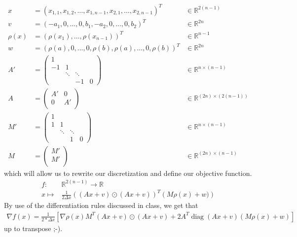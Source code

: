 \documentclass{article}
\DeclareMathOperator{\diag}{diag}
\begin{document}
\begin{align*}
  x&=(x_{1,1},x_{1,2},\dotsc,x_{1,n-1},x_{2,1},\dotsc,x_{2,n-1})^{T} &\in \mathbb{R}^{2(n-1)} \\
  v&=(-a_{1},0,\dotsc,0,b_{1},-a_{2},0,\dotsc,0,b_{2})^{T} &\in \mathbb{R}^{2n} \\
 \rho(x)&=(\rho(x_1),\dotsc,\rho(x_{n-1}))^{T}  &\in \mathbb{R}^{n-1} \\
 w&=(\rho(a),0,\dotsc,0,\rho(b),\rho(a),\dotsc,0,\rho(b))^{T}  &\in \mathbb{R}^{2n}  \\
A'&=\begin{pmatrix}
 1& & & \\
-1&1& & \\
  &\ddots &\ddots & \\
  & &-1 &0  
\end{pmatrix}& \in \mathbb{R}^{n\times(n-1)} \\
A&=\begin{pmatrix}
A' & 0 \\
0 & A' \\
\end{pmatrix} & \in \mathbb{R}^{(2n)\times(2(n-1))} \\
M'&=\begin{pmatrix}
 1& & & \\
1&1& & \\
  &\ddots &\ddots & \\
  & &1 &0  
\end{pmatrix}& \in \mathbb{R}^{n\times(n-1)} \\
M&=
\begin{pmatrix}
M' \\
M' \\
\end{pmatrix} & \in \mathbb{R}^{(2n)\times(n-1)} 
\end{align*}
which will allow us to rewrite our discretization and define our objective function.
\begin{align*}
f:&\mathbb{R}^{2(n-1)}\rightarrow \mathbb{R} \\
x\mapsto& \frac{1}{2\Delta x} \left((Ax+v)\odot (Ax+v)\right)^{T}\left(M\rho(x)+w)\right)
\end{align*}
By use of the differentiation rules discussed in class, we get that
\begin{align*}
  \nabla f (x)=\frac{1}{2*\Delta x}\left[\nabla\rho(x)M^T(Ax+v)\odot(Ax+v)+2A^T\diag(Ax+v)(M\rho(x)+w)\right]
\end{align*}
up to transpose ;-).
\end{document}
